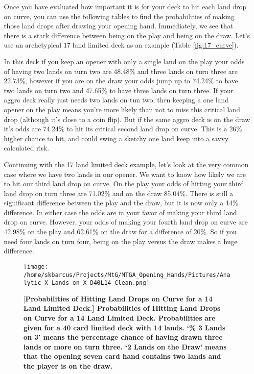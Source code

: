 \documentclass[oneside]{book}   %
\begin{document}
Once you have evaluated how important it is for your deck to hit each land drop on curve, you can use the following tables to find the probabilities of making those land drops after drawing your opening hand. Immediately, we see that there is a stark difference between being on the play and being on the draw. Let's use an archetypical 17 land limited deck as an example (Table \ref{fig:17_curve}). 

In this deck if you keep an opener with only a single land on the play your odds of having two lands on turn two are 48.48\% and three lands on turn three are 22.73\%, however if you are on the draw your odds jump up to 74.24\% to have two lands on turn two and 47.65\% to have three lands on turn three. If your aggro deck really just needs two lands on tun two, then keeping a one land opener on the play means you're more likely than not to miss this critical land drop (although it's close to a coin flip). But if the same aggro deck is on the draw it's odds are 74.24\% to hit its critical second land drop on curve. This is a 26\% higher chance to hit, and could swing a sketchy one land keep into a savvy calculated risk.

Continuing with the 17 land limited deck example, let's look at the very common case where we have two lands in our opener. We want to know how likely we are to hit our third land drop on curve. On the play your odds of hitting your third land drop on turn three are 71.02\% and on the draw 85.04\%. There is still a significant difference between the play and the draw, but it is now only a 14\% difference. In either case the odds are in your favor of making your third land drop on curve. However, your odds of making your fourth land drop on curve are 42.98\% on the play and 62.61\% on the draw for a difference of 20\%. So if you need four lands on turn four, being on the play versus the draw makes a huge difference.

 	\begin{figure}[!ht]
	\centering
	\centerline{\texttt{[image: /home/skbarcus/Projects/MtG/MTGA\_Opening\_Hands/Pictures/Analytic\_X\_Lands\_on\_X\_D40L14\_Clean.png]}}
	[\bf{Probabilities of Hitting Land Drops on Curve for a 14 Land Limited Deck.}]{
	{\bf{Probabilities of Hitting Land Drops on Curve for a 14 Land Limited Deck.}} Probabilities are given for a 40 card limited deck with 14 lands. `\% 3 Lands on 3' means the percentage chance of having drawn three lands or more on turn three. `2 Lands on the Draw' means that the opening seven card hand contains two lands and the player is on the draw.}
	\label{fig:14_curve}
	\end{figure}	
	
\end{document}

